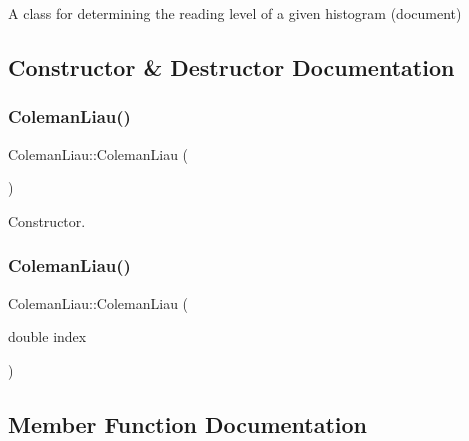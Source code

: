 A class for determining the reading level of a given histogram (document) 

\subsection{Constructor \& Destructor Documentation}
\mbox{\label{class_coleman_liau_a4ff77aa5f5ff81d167a8cabad71e620f}} 
\subsubsection{\texorpdfstring{Coleman\+Liau()}{ColemanLiau()}\hspace{0.1cm}{\footnotesize\ttfamily [1/2]}}
{\footnotesize\ttfamily Coleman\+Liau\+::\+Coleman\+Liau (\begin{DoxyParamCaption}{ }\end{DoxyParamCaption})\hspace{0.3cm}{\ttfamily [inline]}}



Constructor. 

\mbox{\label{class_coleman_liau_a0b46f263a2dd687c2fa89bbef88002d0}} 
\subsubsection{\texorpdfstring{Coleman\+Liau()}{ColemanLiau()}\hspace{0.1cm}{\footnotesize\ttfamily [2/2]}}
{\footnotesize\ttfamily Coleman\+Liau\+::\+Coleman\+Liau (\begin{DoxyParamCaption}\item[{double}]{index }\end{DoxyParamCaption})\hspace{0.3cm}{\ttfamily [inline]}}



\subsection{Member Function Documentation}
\mbox{\label{class_coleman_liau_af0b2de26e53db82cb3e7243de1f26a6f}} 
